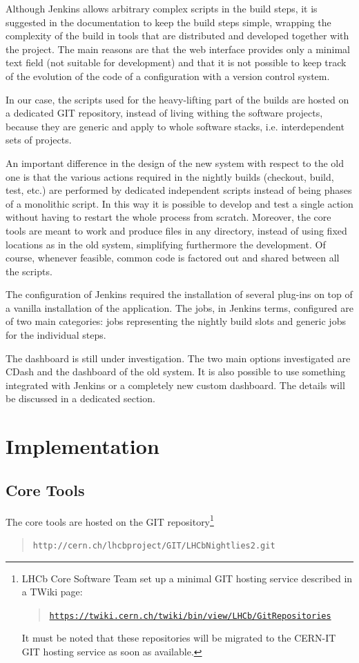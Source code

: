 \documentclass{lhcbnote}
\newcommand{\link}[2]{\href{#1}{#2}}
\newcommand{\urlLink}[1]{\link{#1}{\texttt{#1}}}
\begin{document}
Although Jenkins allows arbitrary complex scripts in the build steps, it is
suggested in the documentation to keep the build steps simple, wrapping the
complexity of the build in tools that are distributed and developed together
with the project.  The main reasons are that the web interface provides only a
minimal text field (not suitable for development) and that it is not possible to
keep track of the evolution of the code of a configuration with a version
control system.

In our case, the scripts used for the heavy-lifting part of the builds are
hosted on a dedicated GIT\cite{GIT} repository, instead of living withing the
software projects, because they are generic and apply to whole software stacks,
i.e. interdependent sets of projects.

An important difference in the design of the new system with respect to the old
one is that the various actions required in the nightly builds (checkout, build,
test, etc.) are performed by dedicated independent scripts instead of being
phases of a monolithic script.  In this way it is possible to develop and test a
single action without having to restart the whole process from scratch.
Moreover, the core tools are meant to work and produce files in any directory,
instead of using fixed locations as in the old system, simplifying furthermore
the development. Of course, whenever feasible, common code is factored out and
shared between all the scripts.

The configuration of Jenkins required the installation of several plug-ins on
top of a vanilla installation of the application.  The jobs, in Jenkins terms,
configured are of two main categories: jobs representing the nightly build slots
and generic jobs for the individual steps.

The dashboard is still under investigation.  The two main options investigated
are CDash\cite{CDash} and the dashboard of the old system.  It is also possible
to use something integrated with Jenkins or a completely new custom dashboard.
The details will be discussed in a dedicated section.

\section{Implementation}
\subsection{Core Tools}
\label{CoreTools}
The core tools are hosted on the GIT repository\footnote{%
  LHCb Core Software Team set up a minimal GIT hosting service described in a
TWiki page:
  \begin{quote}
    \urlLink{https://twiki.cern.ch/twiki/bin/view/LHCb/GitRepositories}
  \end{quote}
  It must be noted that these repositories will be migrated to the CERN-IT GIT
  hosting service as soon as available.}
\begin{quote}
  \texttt{http://cern.ch/lhcbproject/GIT/LHCbNightlies2.git}
\end{quote}
\end{document}
